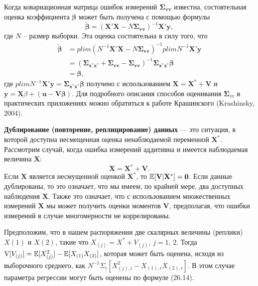 Когда ковариационная матрица ошибок измерений $\mathbf{\Sigma_{vv}}$ известна, состоятельная оценка коэффициента $\mathbf{\beta}$ может быть получена с помощью формулы
\begin{equation}
\mathbf{\tilde{\beta}}=(\mathbf{X'X}-N \mathbf{\Sigma_{vv}})^{-1} \mathbf{X'y},
\end{equation}
где $N$ – размер выборки. Эта оценка состоятельна в силу того, что
\begin{align*}
\mathbf{\tilde{\beta}}&=plim(N^{-1}\mathbf{X'X}-N \mathbf{\Sigma_{vv}})^{-1} plim N^{-1} \mathbf{X'y}  \\
&= (\mathbf{\Sigma_{x^*x^*}} + \mathbf{\Sigma_{vv}} - \mathbf{\Sigma_{vv}})^{-1} \mathbf{\Sigma_{x^*x^*} \beta} \\
&= \mathbf{\beta},
\end{align*}
где $plim N^{-1} \mathbf{X'y}=\mathbf{\Sigma_{x^*x^*} \beta}$ получено с использованием $\mathbf{X}=\mathbf{X^*}+\mathbf{V}$ и $\mathbf{y}=\mathbf{X} \beta + (\mathbf{u}-\mathbf{V \beta})$. Для подробного описания способов оценивания $\mathbf{\Sigma}_{vv}$ в практических приложениях можно обратиться к работе Крашинского (Krashinsky, 2004).

{\bf Дублирование (повторение, реплицирование) данных} –-- это ситуация, в которой доступна несмещенная оценка ненаблюдаемой переменной $\mathbf{X^*}$. Рассмотрим случай, когда ошибка измерений аддитивна и имеется наблюдаемая величина $\mathbf{X}$:
\[
\mathbf{X}=\mathbf{X^*}+\mathbf{V}.
\]
Если $\mathbf{X}$ является несмущенной оценкой $\mathbf{X^*}$, то $\mathbb{E}[\mathbf{V|X^*}]=\mathbf{0}$. Если данные дублированы, то это означает, что мы имеем, по крайней мере, два доступных наблюдения $\mathbf{X}$. Также это означает, что с использованием множественных измерений $\mathbf{X}$ мы может получить оценки моментов $\mathbf{V}$, предполагая, что ошибки измерений в случае многомерности не коррелированы.

Предположим, что в нашем распоряжении две скалярных величины (реплики) $X(1)$ и $X(2)$, такие что $X_{(j)}=X^*+V_{(j)}, \, j=1, \, 2$. Тогда $\mathrm{V}[V_{(j)}]=\mathbb{E}[X^2_{(j)}]-\mathbb{E}[X_{(1)}X_{(2)}]$, которая может быть оценена, исходя из выборочного среднего, как $N^{-1} \Sigma_i [X^2_{(j),i}-X_{(1),i}X_{(2),i}]$. В этом случае параметра регрессии могут быть оценены  по формуле (26.14). 

